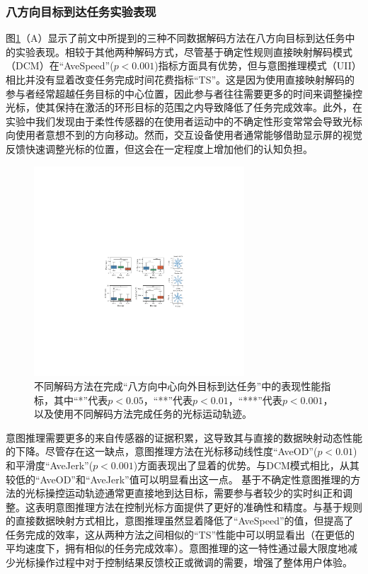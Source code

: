 \subsubsection{八方向目标到达任务实验表现}图\ref{fig:3-13}（A）显示了前文中所提到的三种不同数据解码方法在八方向目标到达任务中的实验表现。相较于其他两种解码方式，尽管基于确定性规则直接映射解码模式（DCM）在``AveSpeed''($p<0.001$)指标方面具有优势，但与意图推理模式（UII）相比并没有显着改变任务完成时间花费指标``TS''。这是因为使用直接映射解码的参与者经常超越任务目标的中心位置，因此参与者往往需要更多的时间来调整操控光标，使其保持在激活的环形目标的范围之内导致降低了任务完成效率。此外，在实验中我们发现由于柔性传感器的在使用者运动中的不确定性形变常常会导致光标向使用者意想不到的方向移动。然而，交互设备使用者通常能够借助显示屏的视觉反馈快速调整光标的位置，但这会在一定程度上增加他们的认知负担。  
\begin{figure}[htb]
    \centering
    \includegraphics[width=0.7\textwidth]{figures/3-Fig-13.pdf}
    \caption{不同解码方法在完成``八方向中心向外目标到达任务''中的表现性能指标，其中“*”代表$p<0.05$，“**”代表$p<0.01$，“***”代表$p<0.001$，以及使用不同解码方法完成任务的光标运动轨迹。}
    \label{fig:3-13}
   \end{figure}     
   
意图推理需要更多的来自传感器的证据积累，这导致其与直接的数据映射动态性能的下降。尽管存在这一缺点，意图推理方法在光标移动线性度``AveOD''($p<0.01$)和平滑度``AveJerk''($p<0.001$)方面表现出了显着的优势。与DCM模式相比，从其较低的``AveOD''和``AveJerk''值可以明显看出这一点。 基于不确定性意图推理的方法的光标操控运动轨迹通常更直接地到达目标，需要参与者较少的实时纠正和调整。这表明意图推理方法在控制光标方面提供了更好的准确性和精度。与基于规则的直接数据映射方式相比，意图推理虽然显着降低了``AveSpeed''的值，但提高了任务完成的效率，这从两种方法之间相似的“TS”性能中可以明显看出（在更低的平均速度下，拥有相似的任务完成效率）。意图推理的这一特性通过最大限度地减少光标操作过程中对于控制结果反馈校正或微调的需要，增强了整体用户体验。  

